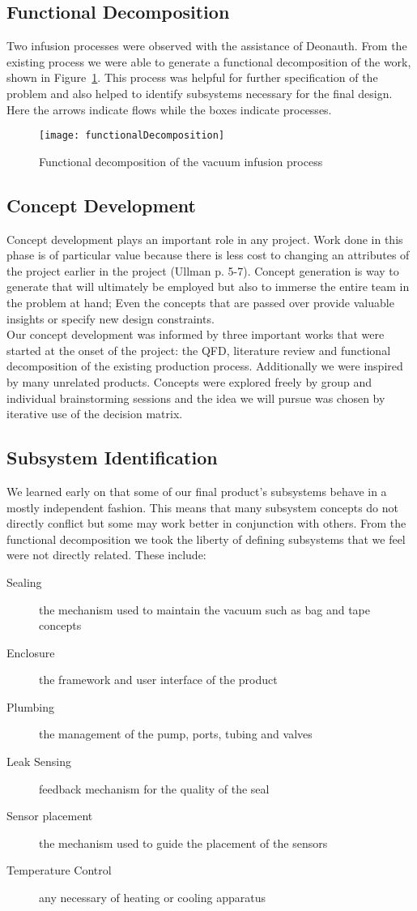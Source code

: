 \documentclass[12pt,letterpaper,notitlepage]{article}
\begin{document}
\subsection{Functional Decomposition}
Two infusion processes were observed with the assistance of Deonauth. From the existing process we were able to generate a functional decomposition of the work, shown in Figure~\ref{fig:functionalDecomposition}. This process was helpful for further specification of the problem and also helped to identify subsystems necessary for the final design. Here the arrows indicate flows while the boxes indicate processes.
\begin{figure}[htbp]
\centering
\texttt{[image: functionalDecomposition]}
\caption{Functional decomposition of the vacuum infusion process}
\label{fig:functionalDecomposition}
\end{figure}
\subsection{Concept Development}
Concept development plays an important role in any project. Work done in this phase is of particular value because there is less cost to changing an attributes of the project earlier in the project (Ullman p. 5-7). Concept generation is way to generate that will ultimately be employed but also to immerse the entire team in the problem at hand; Even the concepts that are passed over provide valuable insights or specify new design constraints.\\

Our concept development was informed by three important works that were started at the onset of the project: the QFD, literature review and functional decomposition of the existing production process. Additionally we were inspired by many unrelated products. Concepts were explored freely by group and individual brainstorming sessions and the idea we will pursue was chosen by iterative use of the decision matrix.
\subsection{Subsystem Identification}
We learned early on that some of our final product's subsystems behave in a mostly independent fashion. This means that many subsystem concepts do not directly conflict but some may work better in conjunction with others. From the functional decomposition we took the liberty of defining subsystems that we feel were not directly related. These include:
\begin{description}
\item[Sealing] the mechanism used to maintain the vacuum such as bag and tape concepts
\item[Enclosure] the framework and user interface of the product
\item[Plumbing] the management of the pump, ports, tubing and valves
\item[Leak Sensing] feedback mechanism for the quality of the seal
\item[Sensor placement] the mechanism used to guide the placement of the sensors
\item[Temperature Control] any necessary of heating or cooling apparatus
\end{description}
\end{document}
